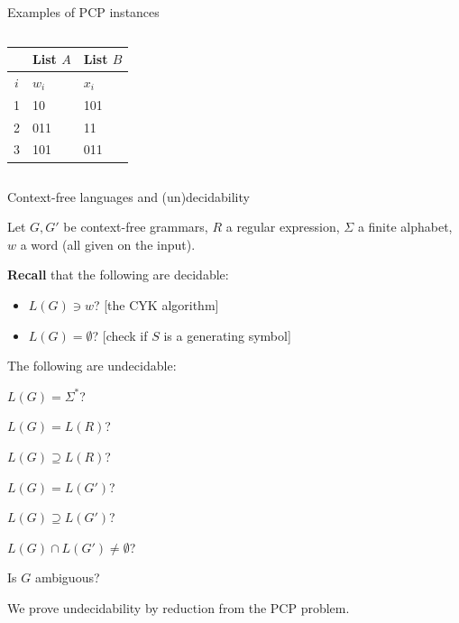 \documentclass[handout]{beamer}
\begin{document}
\begin{frame}{Examples of PCP instances}
\begin{columns}

        \begin{tabular}{c | l | l}
            & List $A$ & List $B$\\
           \hline
           $i$ & $w_i$ & $x_i$ \\
           \hline
           1 & 10 & 101\\
           2 & 011 & 11\\
           3 & 101 & 011
        \end{tabular}
        
    \end{columns}

\end{frame}


\begin{frame}{Context-free languages and (un)decidability}

    Let $G,G'$ be context-free grammars, $R$ a regular expression, $\Sigma$ a finite alphabet, $w$ a word (all given on the input).

    \textbf{Recall}  that the following are \alert{decidable}:
    \begin{itemize}
        \item $L(G)\ni w$? [the CYK algorithm]
        \item $L(G)=\emptyset$? [check if $S$ is a generating symbol]
    \end{itemize}

    \medskip
    
    \begin{theorem}
        The following are \alert{undecidable}:

        \vspace{-9pt}
        \begin{enumerate}[(a)]
            \begin{multicols}{2}
                \item $L(G)=\Sigma^*$?
                \item $L(G)=L(R)$?
                \item $L(G)\supseteq L(R)$?
                \item $L(G)= L(G')$?
                \item $L(G)\supseteq L(G')$?
                \item $L(G)\cap L(G')\neq\emptyset$?
                \item Is $G$ ambiguous?
                \item[\phantom{(a)}] \phantom{Is $G$ ambiguous?}
            \end{multicols}
        \end{enumerate}    
    \end{theorem}
    \vspace{-9pt}
    We prove undecidability by reduction from the PCP problem.
        
\end{frame}
\end{document}
